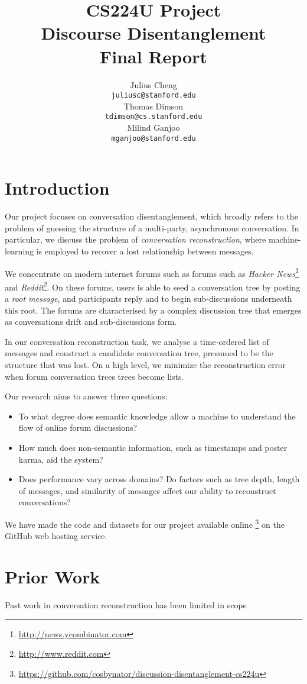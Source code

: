 \documentclass[10pt]{article}
\title{{\small CS224U Project} \\ Discourse Disentanglement \\ \small{Final Report}}
\author{Julius Cheng \\
  {\tt juliusc@stanford.edu}
  \\\And
  Thomas Dimson  \\
  {\tt tdimson@cs.stanford.edu}
  \\\AND
  Milind Ganjoo \\
  {\tt mganjoo@stanford.edu}
}
\date{}
\begin{document}
\maketitle

\section{Introduction}
Our project focuses on conversation disentanglement, which broadly refers to
the problem of guessing the structure of a multi-party, asynchronous
conversation. In particular, we discuss the problem of \textit{conversation
reconstruction}, where machine-learning is employed to recover a lost
relationship between messages.

We concentrate on modern internet forums such as forums such as 
\textit{Hacker News}\footnote{\url{http://news.ycombinator.com}} 
and \textit{Reddit}\footnote{\url{http://www.reddit.com}}. 
On these forums, users is able to seed a conversation tree by posting a 
\textit{root message}, and participants reply and to begin sub-discussions 
underneath this root. The forums are characterised by a complex 
discussion tree that emerges as conversations drift and sub-discussions form.

In our conversation reconstruction task, we analyse a time-ordered list
of messages and construct a candidate conversation tree, presumed to be the structure
that was lost. On a high level, we minimize the reconstruction
error when forum conversation trees trees become lists.

Our research aims to answer three questions:
\begin{itemize}
  \item To what degree does semantic knowledge allow a machine to understand the 
    flow of online forum discussions?
  \item How much does non-semantic information, such as timestamps and poster karma,
    aid the system?
  \item Does performance vary across domains? Do factors such as tree depth,
    length of messages, and similarity of messages affect our ability to
    reconstruct conversations? 
\end{itemize}

We have made the code and datasets for our project available online
\footnote{\url{https://github.com/cosbynator/discussion-disentanglement-cs224u}} on the
GitHub web hosting service.

\section{Prior Work}
\label{sec:prior_work}
Past work in conversation reconstruction has been limited in scope 
\end{document}
